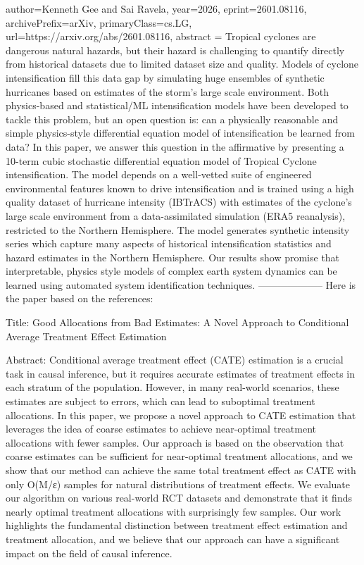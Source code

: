 {      author={Kenneth Gee and Sai Ravela},
      year={2026},
      eprint={2601.08116},
      archivePrefix={arXiv},
      primaryClass={cs.LG},
      url={https://arxiv.org/abs/2601.08116},
      abstract = {Tropical cyclones are dangerous natural hazards, but their hazard is challenging to quantify directly from historical datasets due to limited dataset size and quality. Models of cyclone intensification fill this data gap by simulating huge ensembles of synthetic hurricanes based on estimates of the storm's large scale environment. Both physics-based and statistical/ML intensification models have been developed to tackle this problem, but an open question is: can a physically reasonable and simple physics-style differential equation model of intensification be learned from data? In this paper, we answer this question in the affirmative by presenting a 10-term cubic stochastic differential equation model of Tropical Cyclone intensification. The model depends on a well-vetted suite of engineered environmental features known to drive intensification and is trained using a high quality dataset of hurricane intensity (IBTrACS) with estimates of the cyclone's large scale environment from a data-assimilated simulation (ERA5 reanalysis), restricted to the Northern Hemisphere. The model generates synthetic intensity series which capture many aspects of historical intensification statistics and hazard estimates in the Northern Hemisphere. Our results show promise that interpretable, physics style models of complex earth system dynamics can be learned using automated system identification techniques.}
}
        --------------------
         Here is the paper based on the references:

Title: Good Allocations from Bad Estimates: A Novel Approach to Conditional Average Treatment Effect Estimation

Abstract:
Conditional average treatment effect (CATE) estimation is a crucial task in causal inference, but it requires accurate estimates of treatment effects in each stratum of the population. However, in many real-world scenarios, these estimates are subject to errors, which can lead to suboptimal treatment allocations. In this paper, we propose a novel approach to CATE estimation that leverages the idea of coarse estimates to achieve near-optimal treatment allocations with fewer samples. Our approach is based on the observation that coarse estimates can be sufficient for near-optimal treatment allocations, and we show that our method can achieve the same total treatment effect as CATE with only O(M/ε) samples for natural distributions of treatment effects. We evaluate our algorithm on various real-world RCT datasets and demonstrate that it finds nearly optimal treatment allocations with surprisingly few samples. Our work highlights the fundamental distinction between treatment effect estimation and treatment allocation, and we believe that our approach can have a significant impact on the field of causal inference.

